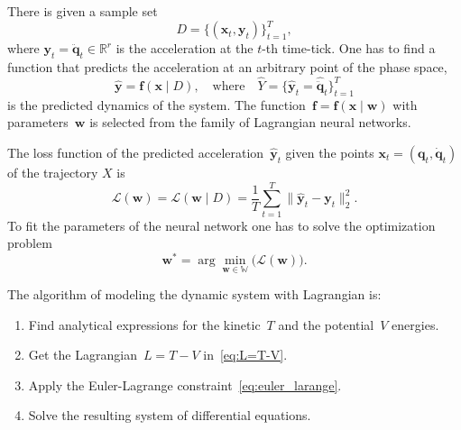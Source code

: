 \documentclass[sn-mathphys-num]{sn-jnl}
\theoremstyle{thmstylethree}
\theoremstyle{thmstyletwo}
\theoremstyle{thmstyleone}
\begin{document}
There is given a sample set
\begin{equation}
D = \{(\mathbf{x}_t, \mathbf{y}_t)\}_{t=1}^{T},
\label{eq:dataset}
\end{equation}
where $\mathbf{y}_t = \ddot{\mathbf{q}}_t \in \mathbb{R}^r$ is the acceleration at the $t$-th time-tick. One has to find a function that predicts the acceleration at an arbitrary point of the phase space,
\begin{equation}
\hat{\mathbf{y}}  = \mathbf{f}(\mathbf{x} \mid D),
\quad
\text{where}
\quad
\hat{Y} = \{\hat{\mathbf{y}}_t = \hat{\ddot{\mathbf{q}}}_t\}_{t=1}^{T}
\label{eq:model_general}
\end{equation}
is the predicted dynamics of the system. The function~$\mathbf{f}=\mathbf{f}(\mathbf{x} \mid \mathbf{w})$ with parameters~$\mathbf{w}$ is selected from the family of Lagrangian neural networks.

The loss function of the predicted acceleration~$\hat{\mathbf{y}}_t$ given the points $\mathbf{x}_t = (\mathbf{q}_t, \dot{\mathbf{q}}_t)$ of the trajectory $X$ is
\begin{equation}
\label{eq:mse_loss}
 \mathcal{L}(\mathbf{w}) = \mathcal{L}(\mathbf{w} \mid D) = \frac{1}{T}\sum_{t=1}^{T} \| \hat{\mathbf{y}}_t - \mathbf{y}_t \|_2^2.
\end{equation}
To fit the parameters of the neural network one has to solve the optimization problem
\begin{equation}
\label{eq:opt_task}
\mathbf{w}^* = \arg\min_{\mathbf{w} \in \mathbb{W}} \bigl( \mathcal{L}(\mathbf{w}) \bigr).
\end{equation}

The algorithm of modeling the dynamic system with  Lagrangian is:
\begin{enumerate}
	\item Find analytical expressions for the kinetic~$T$ and the potential~$V$ energies.
	\item Get the Lagrangian~$L=T-V$ in~\eqref{eq:L=T-V}.
	\item Apply the Euler-Lagrange constraint~\eqref{eq:euler_larange}.
	\item Solve the resulting system of differential equations.
\end{enumerate}
\end{document}
